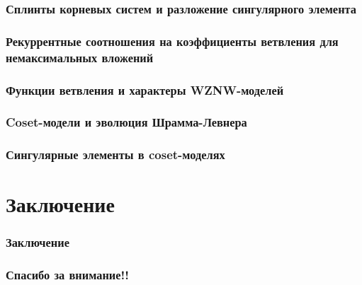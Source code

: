 \documentclass[pdftex]{beamer}
\theoremstyle{definition} \newtheorem{Def}{Definition}
\begin{document}
\begin{frame}
  \frametitle{Сплинты корневых систем и разложение сингулярного элемента}
  
\end{frame}

\begin{frame}
  \frametitle{Рекуррентные соотношения на коэффициенты ветвления для немаксимальных вложений}
  
\end{frame}

\begin{frame}
  \frametitle{Функции ветвления и характеры WZNW-моделей}
  
\end{frame}

\begin{frame}
  \frametitle{Coset-модели и эволюция Шрамма-Левнера}
  
\end{frame}
\begin{frame}
  \frametitle{Сингулярные элементы в coset-моделях}
  
\end{frame}

\section{Заключение}


\begin{frame}
  \frametitle{Заключение}
  
\end{frame}
\begin{frame}
  \frametitle{Спасибо за внимание!!}
\end{frame}
\end{document}
